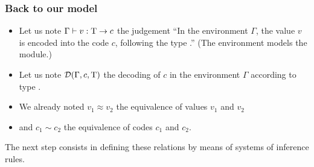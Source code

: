 \documentclass[compress,dvips,xcolor={dvipsnames},t]{beamer}
\newcommand{\coding}[4]{#1 \vdash #2 : #3 \rightarrow #4}
\newcommand{\decoding}[3]{{\cal D}(#1,#2,#3)}
\begin{document}
%
\begin{frame}
\frametitle{Back to our model}

\begin{itemize}

  \item Let us note \textbf{$\coding{\Gamma}{v}{\T}{c}$} the judgement
  ``In the environment $\Gamma$, the value $v$ is encoded into the
  code $c$, following the type \T{}.''  (The environment models the
  \ASN module.)

  \item Let us note \textbf{$\decoding{\Gamma}{c}{\T}$} the decoding
  of $c$ in the environment $\Gamma$ according to type \T{}.

  \item We already noted \textbf{$v_1 \approx v_2$} the equivalence of
  values $v_1$ and $v_2$

  \item and \textbf{$c_1 \sim c_2$} the equivalence of codes $c_1$ and
  $c_2$.

\end{itemize}

The next step consists in defining these relations by means of systems
of inference rules.

\end{frame}
\end{document}
